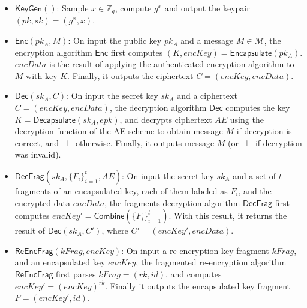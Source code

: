 \documentclass[12pt]{article}
\begin{document}
\begin{itemize}
	\item $\mathsf{KeyGen}()$: Sample $x \in \mathbb Z_q$, compute $g^x$ and output the keypair $(pk, sk) = (g^x, x)$.
	
	\item $\mathsf{Enc}(pk_A, M)$: On input the public key $pk_A$ and a message $M\in\mathcal{M}$, the encryption algorithm $\mathsf{Enc}$ first computes $(K, encKey) = \mathsf{Encapsulate}(pk_A)$.  
	$encData$ is the result of applying the authenticated encryption algorithm to $M$ with key $K$. 
	Finally, it outputs the ciphertext $C = (encKey, encData)$.
	
		\item $\mathsf{Dec}(sk_A, C)$: On input the secret key $sk_A$ and a ciphertext $C = (encKey, encData)$, the decryption algorithm $\mathsf{Dec}$ %
		computes the key $K = \mathsf{Decapsulate}(sk_A, epk)$, and decrypts ciphertext $AE$ using the decryption function of the AE scheme to obtain message $M$ if decryption is correct, and $\perp$ otherwise. Finally, it outputs message $M$ (or $\perp$ if decryption was invalid).
		
		\item $\mathsf{DecFrag}(sk_A, \{F_i\}_{i=1}^t, AE)$: On input the secret key $sk_A$ and a set of $t$ fragments of an encapsulated key, each of them labeled as $F_i$, and the encrypted data $encData$, the fragments decryption algorithm $\mathsf{DecFrag}$ first computes $encKey' = \mathsf{Combine}(\{F_i\}_{i=1}^t)$. With this result, it returns the result of $\mathsf{Dec}(sk_A, C')$, where $C' = (encKey', encData)$. %

	
	\item $\mathsf{ReEncFrag}(kFrag, encKey)$: On input a re-encryption key fragment $kFrag$, and an encapsulated key $encKey$, the fragmented re-encryption algorithm $\mathsf{ReEncFrag}$ first parses $kFrag = (rk, id)$, 
	and computes $encKey' = (encKey)^{rk}$. Finally it outputs the encapsulated key fragment $F = (encKey', id)$. 
\end{itemize}
\end{document}
